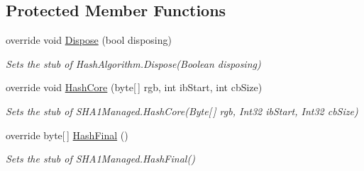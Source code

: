 \subsection*{Protected Member Functions}
\begin{DoxyCompactItemize}
\item 
override void \hyperlink{class_system_1_1_security_1_1_cryptography_1_1_fakes_1_1_stub_s_h_a1_managed_a81026c5a43c1302e68d1eae6fe6b153d}{Dispose} (bool disposing)
\begin{DoxyCompactList}\small\item\em Sets the stub of Hash\-Algorithm.\-Dispose(\-Boolean disposing)\end{DoxyCompactList}\item 
override void \hyperlink{class_system_1_1_security_1_1_cryptography_1_1_fakes_1_1_stub_s_h_a1_managed_a3edb7d3ee7b92a83e6fdf7e0e96b00b1}{Hash\-Core} (byte\mbox{[}$\,$\mbox{]} rgb, int ib\-Start, int cb\-Size)
\begin{DoxyCompactList}\small\item\em Sets the stub of S\-H\-A1\-Managed.\-Hash\-Core(\-Byte\mbox{[}$\,$\mbox{]} rgb, Int32 ib\-Start, Int32 cb\-Size)\end{DoxyCompactList}\item 
override byte\mbox{[}$\,$\mbox{]} \hyperlink{class_system_1_1_security_1_1_cryptography_1_1_fakes_1_1_stub_s_h_a1_managed_af1ffbc5bf7bccc7b5058cdfd24a07bea}{Hash\-Final} ()
\begin{DoxyCompactList}\small\item\em Sets the stub of S\-H\-A1\-Managed.\-Hash\-Final()\end{DoxyCompactList}\end{DoxyCompactItemize}
